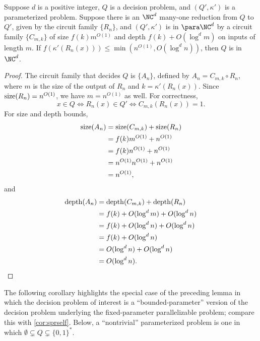 \begin{lemma}\label{lem:reducetonc}
  Suppose $d$ is a positive integer, $Q$ is a decision problem, and $(Q', \kappa')$ is a parameterized problem.
  Suppose there is an $\NC^d$ many-one reduction from $Q$ to $Q'$, given by the circuit family $\{R_n\}$, and $(Q', \kappa')$ is in $\para \NC^d$ by a circuit family $\{C_{m, k}\}$ of size $f(k) m^{O(1)}$ and depth $f(k) + O(\log^d m)$ on inputs of length $m$.
  If $f(\kappa'(R_n(x))) \leq \min(n^{O(1)}, O(\log^d n))$, then $Q$ is in $\NC^d$.
\end{lemma}
\begin{proof}
  The circuit family that decides $Q$ is $\{A_n\}$, defined by $A_n = C_{m, k} \circ R_n$, where $m$ is the size of the output of $R_n$ and $k = \kappa'(R_n(x))$.
  Since $\operatorname{size}(R_n) = n^{O(1)}$, we have $m = n^{O(1)}$ as well.
  For correctness,
  \[
  x \in Q \iff R_n(x) \in Q' \iff C_{m, k}(R_n(x)) = 1.
  \]
  For size and depth bounds,
  \begin{align*}
    \operatorname{size}(A_n) & = \operatorname{size}(C_{m, k}) + \operatorname{size}(R_n) \\
    & = f(k) m^{O(1)} + n^{O(1)} \\
    & = f(k) n^{O(1)} + n^{O(1)} \\
    & = n^{O(1)} n^{O(1)} + n^{O(1)} \\
    & = n^{O(1)},
  \end{align*}
  and
  \begin{align*}
    \operatorname{depth}(A_n) & = \operatorname{depth}(C_{m, k}) + \operatorname{depth}(R_n) \\
    & = f(k) + O(\log^d m) + O(\log^d n) \\
    & = f(k) + O(\log^d n) + O(\log^d n) \\
    & = f(k) + O(\log^d n) \\
    & = O(\log^d n) + O(\log^d n) \\
    & = O(\log^d n). \qedhere
  \end{align*}
\end{proof}

The following corollary highlights the special case of the preceding lemma in which the decision problem of interest is a ``bounded-parameter'' version of the decision problem underlying the fixed-parameter parallelizable problem; compare this with \autoref{cor:sprself}.
Below, a ``nontrivial'' parameterized problem is one in which $\emptyset \subsetneq Q \subsetneq \{0, 1\}^*$.

